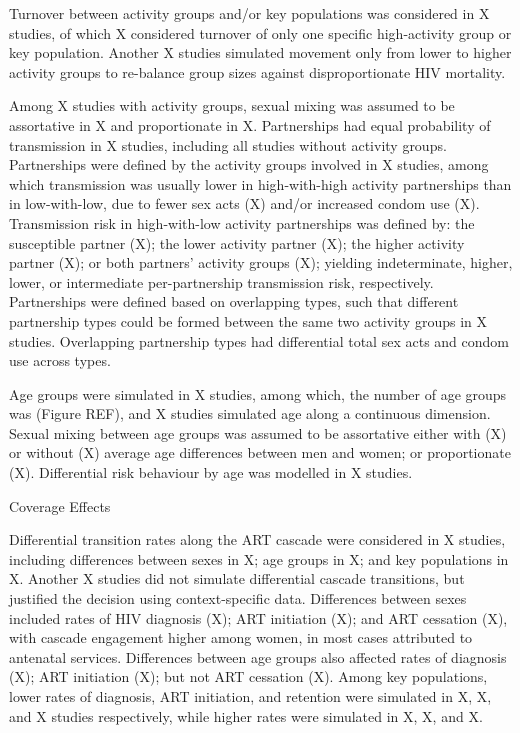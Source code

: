 Turnover between activity groups and/or key populations
was considered in X studies,
of which X considered turnover of only
one specific high-activity group or key population.
Another X studies simulated
movement only from lower to higher activity groups
to re-balance group sizes against disproportionate HIV mortality.

Among X studies with activity groups, sexual mixing was assumed to be
assortative in X and proportionate in X.
Partnerships had equal probability of transmission in X studies,
including all studies without activity groups.
Partnerships were defined by the activity groups involved in X studies,
among which transmission was usually
lower in high-with-high activity partnerships than in low-with-low, due to
fewer sex acts (X) and/or increased condom use (X).
Transmission risk in high-with-low activity partnerships was defined by:
the susceptible partner (X);
the lower activity partner (X);
the higher activity partner (X); or
both partners' activity groups (X);
yielding indeterminate, higher, lower, or intermediate
per-partnership transmission risk, respectively.
Partnerships were defined based on overlapping types, such that
different partnership types could be formed between the same two activity groups in X studies.
Overlapping partnership types had differential total sex acts and condom use across types.

Age groups were simulated in X studies, among which,
the number of age groups was  (Figure REF),
and X studies simulated age along a continuous dimension.
Sexual mixing between age groups was assumed to be assortative
either with (X) or without (X)
average age differences between men and women;
or proportionate (X).
Differential risk behaviour by age was modelled in X studies.

Coverage Effects

Differential transition rates along the ART cascade were considered in
X studies, including differences between
sexes in X;
age groups in X; and
key populations in X.
Another X studies did not simulate differential cascade transitions,
but justified the decision using context-specific data.
Differences between sexes included rates of
HIV diagnosis (X);
ART initiation (X); and
ART cessation (X),
with cascade engagement higher among women,
in most cases attributed to antenatal services.
Differences between age groups also affected
rates of diagnosis (X);
ART initiation (X);
but not ART cessation (X). 
Among key populations, lower rates of
diagnosis, ART initiation, and retention were simulated in
X, X, and X
studies respectively, while higher rates were simulated in
X, X, and X.

